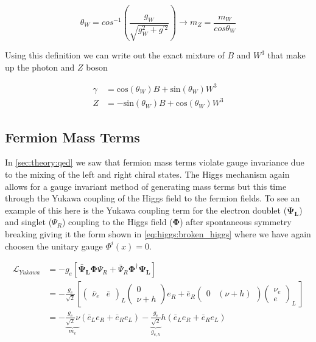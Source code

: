 \begin{equation}
\theta_W = cos^{-1}\left( \frac{g_{W}}{\sqrt{g_{W}^{2}+g^{'2}}} \right) \rightarrow m_{Z} =
\frac{m_{W}}{cos{\theta_{W}}}
\end{equation}

Using this definition we can write out the exact mixture of $B$ and $W^{3}$ that
make up the photon and $Z$ boson

\begin{align}
\gamma &= \text{cos}(\theta_{W})B + \text{sin}(\theta_{W})W^{3} \\
Z &= -\text{sin}(\theta_{W})B + \text{cos}(\theta_{W})W^{3}
\end{align}

\subsection{Fermion Mass Terms} \label{sec:theory:fermion_mass}

In \cref{sec:theory:qed} we saw that fermion mass terms violate gauge
invariance due to the mixing of the left and right chiral states.  The Higgs
mechanism again allows for a gauge invariant method of generating mass terms but
this time through the Yukawa coupling of the Higgs field to the fermion fields.
To see an example of this here is the Yukawa coupling term for the electron
doublet ($\boldsymbol{\Psi_L}$) and singlet ($\Psi_R$) coupling to the Higgs
field ($\boldsymbol{\Phi}$) after spontaneous symmetry breaking giving it the
form shown in \cref{eq:higgs:broken_higgs} where we have again choosen
the unitary gauge $\Phi^{i}(x) = 0$.

\begin{align}
\mathcal{L}_{Yukawa} &= - g_{e} \left[ \boldsymbol{\bar{\Psi}_L}
\boldsymbol{\Phi} \Psi_R + \bar{\Psi}_{R} \boldsymbol{\Phi}^{\dagger} \boldsymbol{\Psi_L}
\right] \\ &= - \frac{g_{e}}{\sqrt{2}} \left[ \left( \begin{matrix}
\bar{\nu}_{e} & \bar{e} \end{matrix} \right)_L \left( \begin{matrix} 0 \\ \nu +
h \end{matrix} \right) e_{R} + \bar{e}_{R} \left( \begin{matrix} 0 & (\nu + h)
\end{matrix} \right) \left( \begin{matrix} \nu_{e} \\ e \end{matrix} \right)_L \ \right] \\ &= - \underbrace{\frac{g_{e}}{\sqrt{2}}
\nu}_{m_{e}} \left( \bar{e}_{L}e_{R} + \bar{e}_{R}e_{L}  \right)
- \underbrace{\frac{g_{e}}{\sqrt{2}}}_{g_{e,h}} h \left(
\bar{e}_{L}e_{R} + \bar{e}_{R}e_{L}  \right) 
\end{align}

